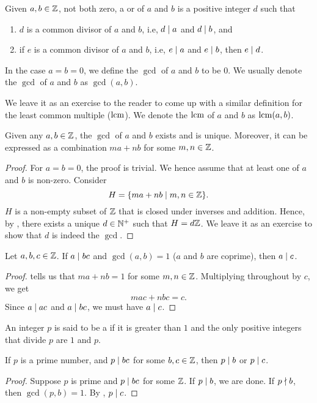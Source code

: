 \begin{defn}
    Given $a,b \in \mathbb{Z}$, not both zero, a  or  of $a$ and $b$ is a positive integer $d$ such that
    \begin{enumerate}
        \item $d$ is a common divisor of $a$ and $b$, i.e, $d \mid a$ and $d \mid b$, and
        \item if $e$ is a common divisor of $a$ and $b$, i.e, $e \mid a$ and $e \mid b$, then $e \mid d$.
    \end{enumerate}
    In the case $a = b =0$, we define the $\gcd$ of $a$ and $b$ to be $0$. We usually denote the $\gcd$ of $a$ and $b$ as $\gcd(a,b)$.
\end{defn}
We leave it as an exercise to the reader to come up with a similar definition for the least common multiple ($\operatorname{lcm}$). We denote the $\operatorname{lcm}$ of $a$ and $b$ as $\operatorname{lcm}(a,b)$.

\begin{prop} \label{prop:bezout}
    Given any $a,b \in \mathbb{Z}$, the $\gcd$ of $a$ and $b$ exists and is unique. Moreover, it can be expressed as a combination $ma + nb$ for some $m,n \in \mathbb{Z}$.
\end{prop}
    
\begin{proof}
    For $a=b=0$, the proof is trivial. We hence assume that at least one of $a$ and $b$ is non-zero. Consider 
    \[
        H = \{ ma + nb \mid m,n \in \mathbb{Z} \}.
    \]
    $H$ is a non-empty subset of $\mathbb{Z}$ that is closed under inverses and addition. Hence, by , there exists a unique $d \in\mathbb{N}^+$ such that $H = d\mathbb{Z}$. We leave it as an exercise to show that $d$ is indeed the $\gcd$. 
\end{proof}

\begin{prop} \label{prop:a|c}
    \item Let $a,b,c \in \mathbb{Z}$. If $a \mid bc$ and $\gcd(a,b) = 1$ ($a$ and $b$ are coprime), then $a \mid c$.
\end{prop}
\begin{proof}
     tells us that $ma + nb = 1$ for some $m,n \in \mathbb{Z}$. Multiplying throughout by $c$, we get 
    \[
        mac + nbc = c.
    \]
    Since $a \mid ac$ and $a \mid bc$, we must have $a \mid c$.
\end{proof}
\begin{defn}
    An integer $p$ is said to be a  if it is greater than $1$ and the only positive integers that divide $p$ are $1$ and $p$.
\end{defn}
\begin{cor} \label{cor:euclid_lemma}
    If $p$ is a prime number, and $p \mid bc$ for some $b,c \in \mathbb{Z}$, then $p\mid b$ or $p\mid c$.
\end{cor}
\begin{proof}
    Suppose $p$ is prime and $p \mid bc$ for some $\mathbb{Z}$. If $p \mid b$, we are done. If $p \nmid b$, then $\gcd(p,b) = 1$. By , $p \mid c$.
\end{proof}

